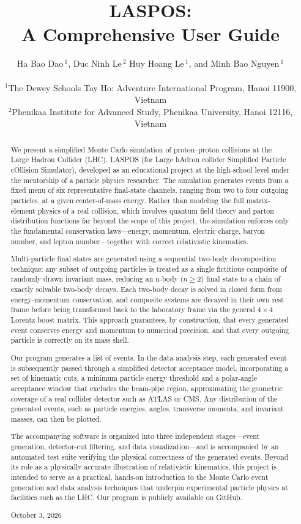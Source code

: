 \documentclass{article}
\title{LASPOS:\\A Comprehensive User Guide}
\author{%
  Ha Bao Dao\,$^{1}$, 
  Duc Ninh Le\,$^{2}$
  Huy Hoang Le\,$^{1}$, and
  Minh Bao Nguyen\,$^{1}$\\  [2ex]
  \\
  \small $^{1}$The Dewey Schools Tay Ho: Adventure International Program, Hanoi 11900, Vietnam\\[0.5ex]
  \small $^{2}$Phenikaa Institute for Advanced Study, Phenikaa University, Hanoi 12116, Vietnam
}
\date{}
\begin{document}
\newcommand{\secref}[1]{Section~\ref{#1}}
\maketitle
\newpage
\begin{abstract}
    We present a simplified Monte Carlo simulation of proton--proton collisions at the Large Hadron Collider (LHC), LASPOS (for Large hAdron collider Simplified Particle cOllision Simulator), developed as an educational project at the high-school level under the mentorship of a particle physics researcher. The simulation generates events from a fixed menu of six representative final-state channels, ranging from two to four outgoing particles, at a given center-of-mass energy. Rather than modeling the full matrix-element physics of a real collision, which involves quantum field theory and parton distribution functions far beyond the scope of this project, the simulation enforces only the fundamental conservation laws---energy, momentum, electric charge, baryon number, and lepton number---together with correct relativistic kinematics.

    Multi-particle final states are generated using a sequential two-body decomposition technique: any subset of outgoing particles is treated as a single fictitious composite of randomly drawn invariant mass, reducing an n-body ($n\geq2$) final state to a chain of exactly solvable two-body decays. Each two-body decay is solved in closed form from energy-momentum conservation, and composite systems are decayed in their own rest frame before being transformed back to the laboratory frame via the general $4\times4$ Lorentz boost matrix. This approach guarantees, by construction, that every generated event conserves energy and momentum to numerical precision, and that every outgoing particle is correctly on its mass shell.

    Our program generates a list of events. In the data analysis step, each generated event is subsequently passed through a simplified detector acceptance model, incorporating a set of kinematic cuts, a minimum particle energy threshold and a polar-angle acceptance window that excludes the beam-pipe region, approximating the geometric coverage of a real collider detector such as ATLAS or CMS. Any distribution of the generated events, such as particle energies, angles, transverse momenta, and invariant masses, can then be plotted.

    The accompanying software is organized into three independent stages---event generation, detector-cut filtering, and data visualization---and is accompanied by an automated test suite verifying the physical correctness of the generated events. Beyond its role as a physically accurate illustration of relativistic kinematics, this project is intended to serve as a practical, hands-on introduction to the Monte Carlo event generation and data analysis techniques that underpin experimental particle physics at facilities such as the LHC. Our program is publicly available on GitHub.
    \\\par\smallskip\noindent October 3, 2026
\end{abstract}
\newpage
\end{document}
